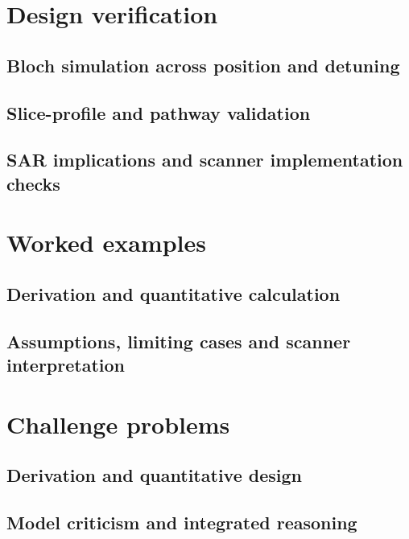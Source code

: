 \section{Design verification}
\label{sec:18:design-verification}
\subsection{Bloch simulation across position and detuning}
\subsection{Slice-profile and pathway validation}
\subsection{SAR implications and scanner implementation checks}

\section{Worked examples}
\label{sec:18:worked-examples}
\subsection{Derivation and quantitative calculation}
\subsection{Assumptions, limiting cases and scanner interpretation}

\section{Challenge problems}
\label{sec:18:challenge-problems}
\subsection{Derivation and quantitative design}
\subsection{Model criticism and integrated reasoning}
